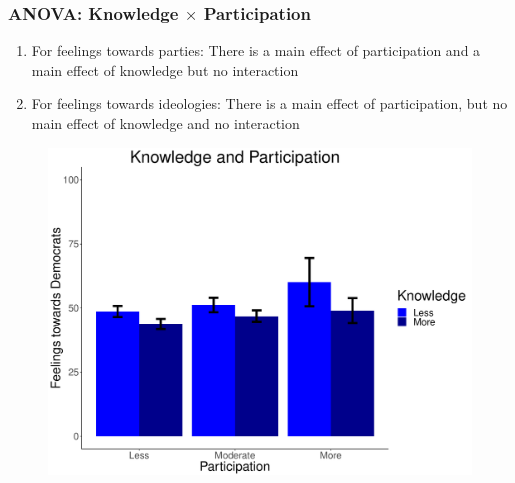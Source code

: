 \documentclass[14pt]{beamer}
\begin{document}
\begin{frame}
\frametitle{ANOVA: Knowledge $\times$ Participation}
\begin{enumerate}
	\item For feelings towards parties: There is a main effect of participation and a main effect of knowledge but no interaction
	\item For feelings towards ideologies: There is a main effect of participation, but no main effect of knowledge and no interaction
\end{enumerate}
\end{frame}

\begin{frame}
\begin{center}
	\begin{figure}[ht!]  
		{	 \includegraphics[width=\textwidth]{KPDem}}
	\end{figure}
\end{center}
\end{frame}
\end{document}
